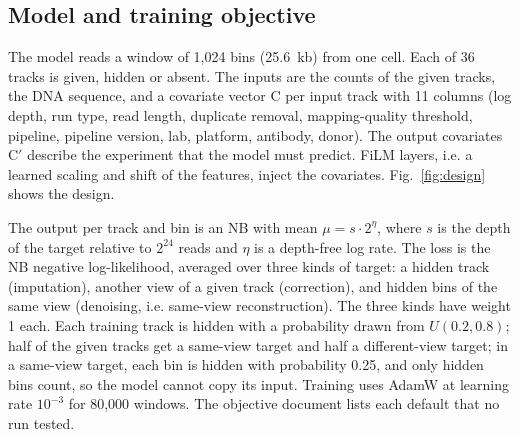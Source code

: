 \documentclass[pdflatex,sn-mathphys-num]{sn-jnl}
\newcommand{\lit}[1]{#1}
\newcommand{\cl}[1]{#1}
\begin{document}
\subsection{Model and training objective}

\cl{The model reads a window of \lit{1,024} bins (\lit{25.6}~kb) from one cell. Each of \lit{36} tracks is given, hidden or absent. The inputs are the counts of the given tracks, the DNA sequence, and a covariate vector C per input track with \lit{11} columns (log depth, run type, read length, duplicate removal, mapping-quality threshold, pipeline, pipeline version, lab, platform, antibody, donor). The output covariates C$'$ describe the experiment that the model must predict. FiLM layers, i.e. a learned scaling and shift of the features, inject the covariates. Fig.~\ref{fig:design} shows the design.}

\cl{The output per track and bin is an NB with mean $\mu = s \cdot \lit{2}^{\eta}$, where $s$ is the depth of the target relative to \lit{$2^{24}$} reads and $\eta$ is a depth-free log rate. The loss is the NB negative log-likelihood, averaged over three kinds of target: a hidden track (imputation), another view of a given track (correction), and hidden bins of the same view (denoising, i.e. same-view reconstruction). The three kinds have weight \lit{1} each. Each training track is hidden with a probability drawn from $U(\lit{0.2}, \lit{0.8})$; half of the given tracks get a same-view target and half a different-view target; in a same-view target, each bin is hidden with probability \lit{0.25}, and only hidden bins count, so the model cannot copy its input. Training uses AdamW at learning rate \lit{$10^{-3}$} for \lit{80,000} windows. The objective document lists each default that no run tested.}
\end{document}
